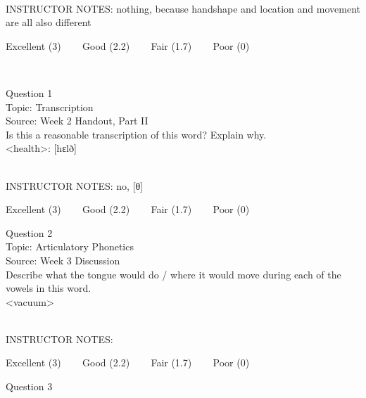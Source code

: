 \documentclass[12pt]{article}
\begin{document}
~\\
INSTRUCTOR NOTES: nothing, because handshape and location and movement are all also different


\vfill
Excellent (3) ~~~ Good (2.2) ~~~ Fair (1.7) ~~~ Poor (0)
\newpage

\begin{center}
\textbf{{\color{red}{\HUGE END OF EXAM}}}\\

\end{center}
\newpage

\begin{center}
\textbf{{\color{blue}{\HUGE START OF EXAM\\}}}

\textbf{{\color{blue}{\HUGE Student ID: 62089\\}}}

\textbf{{\color{blue}{\HUGE \\}}}

\end{center}
\newpage

{\large Question 1}\\

Topic: Transcription\\
Source: Week 2 Handout, Part II\\

Is this a reasonable transcription of this word? Explain why.\\

<health>: {[hɛlð]}


~\\
INSTRUCTOR NOTES: no, [θ]


\vfill
Excellent (3) ~~~ Good (2.2) ~~~ Fair (1.7) ~~~ Poor (0)
\newpage

{\large Question 2}\\

Topic: Articulatory Phonetics\\
Source: Week 3 Discussion\\

Describe what the tongue would do / where it would move during each of the vowels in this word.\\

<vacuum>


~\\
INSTRUCTOR NOTES: 


\vfill
Excellent (3) ~~~ Good (2.2) ~~~ Fair (1.7) ~~~ Poor (0)
\newpage

{\large Question 3}\\
\end{document}

